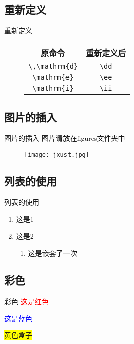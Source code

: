 \documentclass{jxustbeamer}
\begin{document}
\subsection{重新定义}
\begin{frame}[fragile]{重新定义}
	\begin{figure}[h]
		\begin{tabular}{|c|c|}
			\hline
			原命令 & 重新定义后\\
			\hline
			\verb|\,\mathrm{d}| & \verb|\dd|\\
			\hline
			\verb|\mathrm{e}| & \verb|\ee|\\
			\hline
			\verb|\mathrm{i}| & \verb|\ii|\\
			\hline
		\end{tabular}
	\end{figure}
\end{frame}
\subsection{图片的插入}
\begin{frame}{图片的插入}
	图片请放在figures文件夹中
	\begin{figure}[h]
		\centering
		\texttt{[image: jxust.jpg]}
	\end{figure}
	
\end{frame}
\subsection{列表的使用}
\begin{frame}{列表的使用}
	\begin{enumerate}
		\item 这是1
		\item 这是2
		\begin{enumerate}
			\item 这是嵌套了一次
		\end{enumerate}
	\end{enumerate}
\end{frame}

\subsection{彩色}
\begin{frame}{彩色}
	\textcolor{red}{这是红色}
	
	\textcolor{blue}{这是蓝色}
	
	\colorbox{yellow}{黄色盒子}
	
\end{frame}
\end{document}
